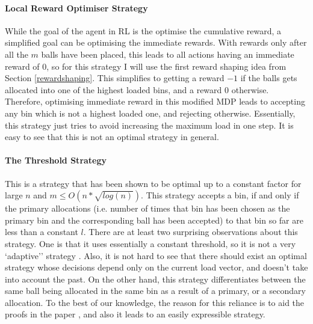 \paragraph{Local Reward Optimiser Strategy}

While the goal of the agent in RL is the optimise the cumulative reward, a simplified goal can be optimising the immediate rewards. With rewards only after all the $m$ balls have been placed, this leads to all actions having an immediate reward of $0$, so for this strategy I will use the first reward shaping idea from Section \ref{rewardshaping}. This simplifies to getting a reward $-1$ if the balls gets allocated into one of the highest loaded bins, and a reward $0$ otherwise. Therefore, optimising immediate reward in this modified MDP leads to accepting any bin which is not a highest loaded one, and rejecting otherwise. Essentially, this strategy just tries to avoid increasing the maximum load in one step. It is easy to see that this is not an optimal strategy in general. 

\paragraph{The Threshold Strategy} 

This is a strategy that has been shown to be optimal  \cite{feldheim2021thinning} up to a constant factor for large $n$ and $m\leq O(n*\sqrt{log(n)})$. This strategy accepts a bin, if and only if the primary allocations (i.e. number of times that bin has been chosen as the primary bin and the corresponding ball has been accepted) to that bin so far are less than a constant $l$. There are at least two surprising observations about this strategy. One is that it uses essentially a constant threshold, so it is not a very `adaptive'' strategy . Also, it is not hard to see that there should exist an optimal strategy whose decisions depend only on the current load vector, and doesn't take into account the past. On the other hand, this strategy differentiates between the same ball being allocated in the same bin as a result of a primary, or a secondary allocation. To the best of our knowledge, the reason for this reliance is to aid the proofs in the paper \cite{feldheim2021thinning}, and also it leads to an easily expressible strategy. 

